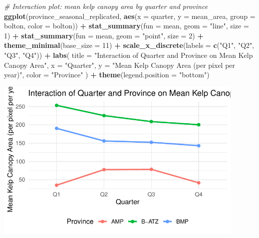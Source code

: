 \documentclass[
  british,
  10pt,
]{article}
\newenvironment{Shaded}{\begin{snugshade}}{\end{snugshade}}
\newcommand{\AttributeTok}[1]{\textcolor[rgb]{0.13,0.29,0.53}{#1}}
\newcommand{\CommentTok}[1]{\textcolor[rgb]{0.56,0.35,0.01}{\textit{#1}}}
\newcommand{\DecValTok}[1]{\textcolor[rgb]{0.00,0.00,0.81}{#1}}
\newcommand{\FunctionTok}[1]{\textcolor[rgb]{0.13,0.29,0.53}{\textbf{#1}}}
\newcommand{\NormalTok}[1]{#1}
\newcommand{\SpecialCharTok}[1]{\textcolor[rgb]{0.81,0.36,0.00}{\textbf{#1}}}
\newcommand{\StringTok}[1]{\textcolor[rgb]{0.31,0.60,0.02}{#1}}
\begin{document}
\begin{Shaded}
\begin{Highlighting}[]
\CommentTok{\# Interaction plot: mean kelp canopy area by quarter and province}
\FunctionTok{ggplot}\NormalTok{(province\_seasonal\_replicated,}
                           \FunctionTok{aes}\NormalTok{(}\AttributeTok{x =}\NormalTok{ quarter,}
                               \AttributeTok{y =}\NormalTok{ mean\_area,}
                               \AttributeTok{group =}\NormalTok{ bolton,}
                               \AttributeTok{color =}\NormalTok{ bolton)) }\SpecialCharTok{+}
  \FunctionTok{stat\_summary}\NormalTok{(}\AttributeTok{fun =}\NormalTok{ mean, }\AttributeTok{geom =} \StringTok{"line"}\NormalTok{, }\AttributeTok{size =} \DecValTok{1}\NormalTok{) }\SpecialCharTok{+}
  \FunctionTok{stat\_summary}\NormalTok{(}\AttributeTok{fun =}\NormalTok{ mean, }\AttributeTok{geom =} \StringTok{"point"}\NormalTok{, }\AttributeTok{size =} \DecValTok{2}\NormalTok{) }\SpecialCharTok{+}
  \FunctionTok{theme\_minimal}\NormalTok{(}\AttributeTok{base\_size =} \DecValTok{11}\NormalTok{) }\SpecialCharTok{+}
  \FunctionTok{scale\_x\_discrete}\NormalTok{(}\AttributeTok{labels =} \FunctionTok{c}\NormalTok{(}\StringTok{"Q1"}\NormalTok{, }\StringTok{"Q2"}\NormalTok{, }\StringTok{"Q3"}\NormalTok{, }\StringTok{"Q4"}\NormalTok{)) }\SpecialCharTok{+}
  \FunctionTok{labs}\NormalTok{(}
    \AttributeTok{title =} \StringTok{"Interaction of Quarter and Province on Mean Kelp Canopy Area"}\NormalTok{,}
    \AttributeTok{x =} \StringTok{"Quarter"}\NormalTok{,}
    \AttributeTok{y =} \StringTok{"Mean Kelp Canopy Area (per pixel per year)"}\NormalTok{,}
    \AttributeTok{color =} \StringTok{"Province"}
\NormalTok{  ) }\SpecialCharTok{+}
  \FunctionTok{theme}\NormalTok{(}\AttributeTok{legend.position =} \StringTok{"bottom"}\NormalTok{)}
\end{Highlighting}
\end{Shaded}

\begin{center}
\includegraphics[width=12cm,height=\textheight,keepaspectratio]{BCB744_Biostats_Prac_Exam_2025_files/figure-pdf/chunk21-2.pdf}
\end{center}
\end{document}
